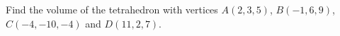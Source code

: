 Find the volume of the tetrahedron with vertices $A(2,3,5)$, $B(-1,6,9)$, $C(-4,-10,-4)$ and $D(11,2,7)$.

